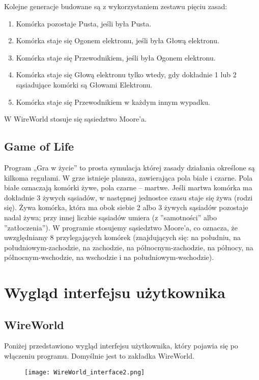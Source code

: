 \documentclass[10pt, oneside]{article}
\begin{document}
Kolejne generacje budowane są z wykorzystaniem zestawu pięciu zasad:
\begin{enumerate}
\item Komórka pozostaje Pusta, jeśli była Pusta.
\item Komórka staje się Ogonem elektronu, jeśli była Głową elektronu.
\item Komórka staje się Przewodnikiem, jeśli była Ogonem elektronu.
\item Komórka staje się Głową elektronu tylko wtedy, gdy dokładnie 1 lub 2 sąsiadujące komórki są Głowami Elektronu.
\item Komórka staje się Przewodnikiem w każdym innym wypadku.
\end{enumerate}

W WireWorld stosuje się sąsiedztwo Moore'a.

\subsection{Game of Life}
Program „Gra w życie” to prosta symulacja której zasady działania określone są kilkoma regułami. W grze istnieje plansza, zawierająca pola białe
i czarne. Pola białe oznaczają komórki żywe, pola czarne – martwe. Jeśli
martwa komórka ma dokładnie 3 żywych sąsiadów, w następnej jednostce czasu staje się żywa (rodzi się). Żywa komórka, która ma obok siebie 2
albo 3 żywych sąsiadów pozostaje nadal żywa; przy innej liczbie sąsiadów
umiera (z ”samotności” albo ”zatłoczenia”). W programie stosujemy sąsiedztwo Moore’a, co oznacza, że uwzględniamy 8 przylegających komórek
(znajdujących się: na południu, na południowym-zachodzie, na zachodzie,
na północnym-zachodzie, na północy, na północnym-wschodzie, na wschodzie i na południowym-wschodzie).
\section{Wygląd interfejsu użytkownika}
\subsection{WireWorld}
Poniżej przedstawiono wygląd interfejsu użytkownika, który pojawia się po włączeniu programu. Domyślnie jest to zakładka WireWorld.

\begin{figure}[H]
	\centering
	\texttt{[image: WireWorld\_interface2.png]}
	
\end{figure}
\end{document}
